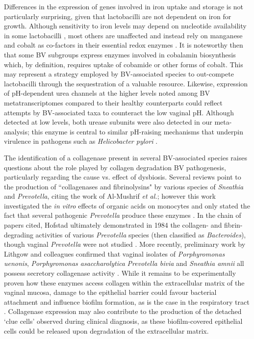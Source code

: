 \documentclass[sn-mathphys,Numbered]{sn-jnl}%
\begin{document}
Differences in the expression of genes involved in iron uptake and storage is not particularly surprising, given that lactobacilli are not dependent on iron for growth. Although sensitivity to iron levels may depend on nucleotide availability in some lactobacilli \citep{elli_iron_2000}, most others are unaffected and instead rely on manganese and cobalt as co-factors in their essential redox enzymes \citep{weinberg_lactobacillus_1997}. It is noteworthy then that some BV subgroups express enzymes involved in cobalamin biosynthesis which, by definition, requires uptake of cobamide or other forms of cobalt. This may represent a strategy employed by BV-associated species to out-compete lactobacilli through the sequestration of a valuable resource. Likewise, expression of pH-dependent urea channels at the higher levels noted among BV metatranscriptomes compared to their healthy counterparts could reflect attempts by BV-associated taxa to counteract the low vaginal pH. Although detected at low levels, both urease subunits were also detected in our meta-analysis; this enzyme is central to similar pH-raising mechanisms that underpin virulence in pathogens such as \textit{Helicobacter pylori} \citep{strugatsky_structure_2013}.

The identification of a collagenase present in several BV-associated species raises questions about the role played by collagen degradation BV pathogenesis, particularly regarding the cause vs. effect of dysbiosis. Several reviews \citep{onderdonk_human_2020,africa_anaerobes_2014} point to the production of ``collagenases and fibrinolysins" by various species of \textit{Sneathia} and \textit{Prevotella}, citing the work of Al-Mushrif \textit{et al.}; however this work investigated the \textit{in vitro} effects of organic acids on monocytes and only stated the fact that several pathogenic \textit{Prevotella} produce these enzymes \citep{al-mushrif_inhibition_2000}. In the chain of papers cited, Hofstad ultimately demonstrated in 1984 the collagen- and fibrin-degrading activities of various \textit{Prevotella} species (then classified as \textit{Bacteroides}), though vaginal \textit{Prevotella} were not studied \citep{hofstad_pathogenicity_1984}. More recently, preliminary work by Lithgow and colleagues confirmed that vaginal isolates of \textit{Porphyromonas uenonis}, \textit{{Porphyromonas asaccharolytica}} \textit{Prevotella bivia} and \textit{Sneathia amnii} all possess secretory collagenase activity \citep{lithgow_collagenase_2022}. While it remains to be experimentally proven how these enzymes access collagen within the extracellular matrix of the vaginal mucosa, damage to the epithelial barrier could favour bacterial attachment and influence biofilm formation, as is the case in the respiratory tract \citep{boase_bacterial-induced_2013,chegini_destruction_2023}. Collagenase expression may also contribute to the production of the detached `clue cells' \citep{simoes2006clinical} observed during clinical diagnosis, as these biofilm-covered epithelial cells could be released upon degradation of the extracellular matrix.
\end{document}
